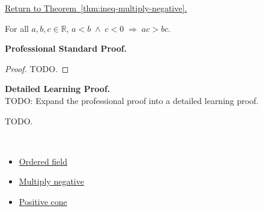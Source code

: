 \newpage
{}
\label{prf:ineq-multiply-negative}

\begin{remark*}[Return]
\hyperref[thm:ineq-multiply-negative]{Return to Theorem~\ref*{thm:ineq-multiply-negative}.}
\end{remark*}

\begin{theorem*}
For all $a, b, c \in \mathbb{R}$,
$a < b \;\land\; c < 0 \;\Rightarrow\; ac > bc$.
\end{theorem*}

\textbf{Professional Standard Proof.}~\\
\begin{proof}
TODO.
\end{proof}

\textbf{Detailed Learning Proof.}~\\
TODO: Expand the professional proof into a detailed learning proof.


\begin{remark*}
TODO.
\end{remark*}

\begin{remark*}[Dependencies]~\\
\begin{itemize}
  \item \hyperref[def:ordered-field]{Ordered field}
  \item \hyperref[thm:multiply-negative]{Multiply negative}
  \item \hyperref[def:positive-cone]{Positive cone}
\end{itemize}
\end{remark*}
